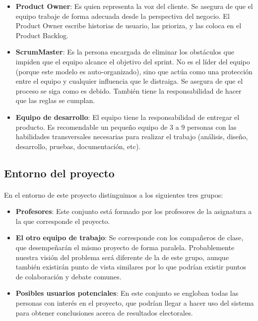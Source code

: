 \documentclass{article}
\begin{document}
            \begin{itemize}
            
            	\item \textbf{Product Owner}: Es quien representa la voz del cliente. Se asegura de que el equipo trabaje de forma adecuada desde la perspectiva del negocio. El Product Owner escribe historias de usuario, las prioriza, y las coloca en el Product Backlog. 
              	\item \textbf{ScrumMaster}: Es la persona encargada de eliminar los obstáculos que impiden que el equipo alcance el objetivo del sprint. No es el líder del equipo (porque este modelo es auto-organizado), sino que actúa como una protección entre el equipo y cualquier influencia que le distraiga. Se asegura de que el proceso se siga como es debido. También tiene la responsabilidad de hacer que las reglas se cumplan.
                
                \item \textbf{Equipo de desarrollo}: El equipo tiene la responsabilidad de entregar el producto. Es recomendable un pequeño equipo de 3 a 9 personas con las habilidades transversales necesarias para realizar el trabajo (análisis, diseño, desarrollo, pruebas, documentación, etc).
                
            \end{itemize}

		\subsection{Entorno del proyecto}
        	
            \paragraph{}
            En el entorno de este proyecto distinguimos a los siguientes tres grupos:
        	\begin{itemize}
        		\item \textbf{Profesores}: Este conjunto está formado por los profesores de la asignatura a la que corresponde el proyecto.

        		\item \textbf{El otro equipo de trabajo}: Se corresponde con los compañeros de clase, que desempeñarán el mismo proyecto de forma paralela. Probablemente nuestra visión del problema será diferente de la de este grupo, aunque también existirán punto de vista similares por lo que podrían existir puntos de colaboración y debate comunes.

        		\item \textbf{Posibles usuarios potenciales}: En este conjunto se engloban todas las personas con interés en el proyecto, que podrían llegar a hacer uso del sistema para obtener conclusiones acerca de resultados electorales.

        	\end{itemize}
\end{document}
